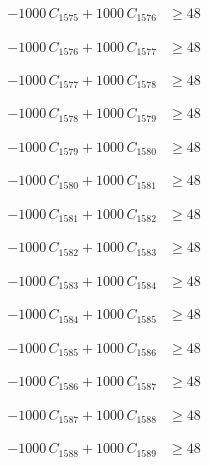 \documentclass[a4paper,11pt]{article}
\begin{document}
\begin{align}
-1000\,C_{1575} + 1000\,C_{1576} &\geq 48 \nonumber
\end{align}

\begin{align}
-1000\,C_{1576} + 1000\,C_{1577} &\geq 48 \nonumber
\end{align}

\begin{align}
-1000\,C_{1577} + 1000\,C_{1578} &\geq 48 \nonumber
\end{align}

\begin{align}
-1000\,C_{1578} + 1000\,C_{1579} &\geq 48 \nonumber
\end{align}

\begin{align}
-1000\,C_{1579} + 1000\,C_{1580} &\geq 48 \nonumber
\end{align}

\begin{align}
-1000\,C_{1580} + 1000\,C_{1581} &\geq 48 \nonumber
\end{align}

\begin{align}
-1000\,C_{1581} + 1000\,C_{1582} &\geq 48 \nonumber
\end{align}

\begin{align}
-1000\,C_{1582} + 1000\,C_{1583} &\geq 48 \nonumber
\end{align}

\begin{align}
-1000\,C_{1583} + 1000\,C_{1584} &\geq 48 \nonumber
\end{align}

\begin{align}
-1000\,C_{1584} + 1000\,C_{1585} &\geq 48 \nonumber
\end{align}

\begin{align}
-1000\,C_{1585} + 1000\,C_{1586} &\geq 48 \nonumber
\end{align}

\begin{align}
-1000\,C_{1586} + 1000\,C_{1587} &\geq 48 \nonumber
\end{align}

\begin{align}
-1000\,C_{1587} + 1000\,C_{1588} &\geq 48 \nonumber
\end{align}

\begin{align}
-1000\,C_{1588} + 1000\,C_{1589} &\geq 48 \nonumber
\end{align}
\end{document}
